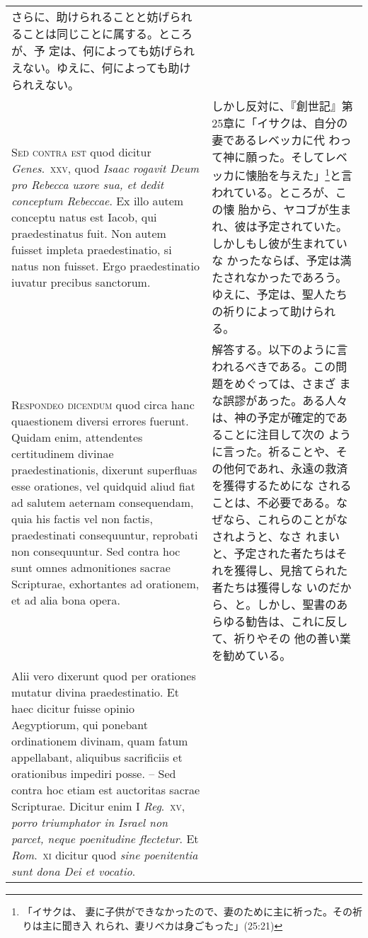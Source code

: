 \documentclass[10pt]{jsarticle} %
\begin{document}
\begin{longtable}{p{21em}p{21em}}
さらに、助けられることと妨げられることは同じことに属する。ところが、予
定は、何によっても妨げられえない。ゆえに、何によっても助けられえない。

\\


{\scshape Sed contra est} quod dicitur {\itshape Genes}.~{\scshape xxv}, quod
{\itshape Isaac rogavit Deum pro Rebecca uxore sua, et dedit conceptum
Rebeccae}. Ex illo autem conceptu natus est Iacob, qui praedestinatus
fuit. Non autem fuisset impleta praedestinatio, si natus non
fuisset. Ergo praedestinatio iuvatur precibus sanctorum.


&


しかし反対に、『創世記』第25章に「イサクは、自分の妻であるレベッカに代
わって神に願った。そしてレベッカに懐胎を与えた」\footnote{「イサクは、
妻に子供ができなかったので、妻のために主に祈った。その祈りは主に聞き入
れられ、妻リベカは身ごもった」(25:21)}と言われている。ところが、この懐
胎から、ヤコブが生まれ、彼は予定されていた。しかしもし彼が生まれていな
かったならば、予定は満たされなかったであろう。ゆえに、予定は、聖人たち
の祈りによって助けられる。

\\


{\scshape Respondeo dicendum} quod circa hanc quaestionem
diversi errores fuerunt. Quidam enim, attendentes certitudinem divinae
praedestinationis, dixerunt superfluas esse orationes, vel quidquid
aliud fiat ad salutem aeternam consequendam, quia his factis vel non
factis, praedestinati consequuntur, reprobati non consequuntur. Sed
contra hoc sunt omnes admonitiones sacrae Scripturae, exhortantes ad
orationem, et ad alia bona opera. 


&

解答する。以下のように言われるべきである。この問題をめぐっては、さまざ
まな誤謬があった。ある人々は、神の予定が確定的であることに注目して次の
ように言った。祈ることや、その他何であれ、永遠の救済を獲得するためにな
されることは、不必要である。なぜなら、これらのことがなされようと、なさ
れまいと、予定された者たちはそれを獲得し、見捨てられた者たちは獲得しな
いのだから、と。しかし、聖書のあらゆる勧告は、これに反して、祈りやその
他の善い業を勧めている。

\\

Alii vero dixerunt quod per orationes
mutatur divina praedestinatio. Et haec dicitur fuisse opinio
Aegyptiorum, qui ponebant ordinationem divinam, quam fatum appellabant,
aliquibus sacrificiis et orationibus impediri posse. -- Sed contra hoc
etiam est auctoritas sacrae Scripturae. Dicitur enim I {\itshape Reg}.~{\scshape xv}, {\itshape porro
triumphator in Israel non parcet, neque poenitudine flectetur}. Et
{\itshape Rom}.~{\scshape xi} dicitur quod {\itshape sine poenitentia
 sunt dona Dei et vocatio}. 


\end{longtable}
\end{document}
